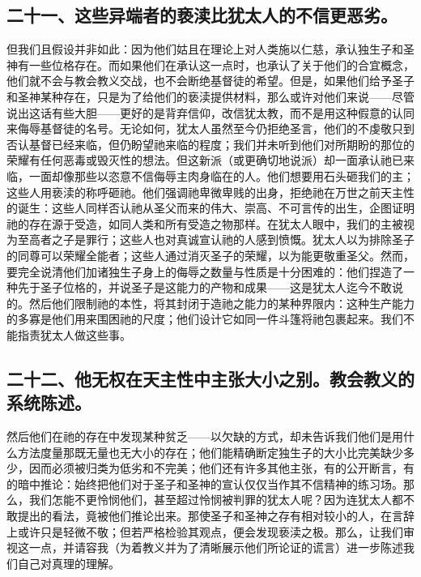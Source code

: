 
\subsection{二十一、这些异端者的亵渎比犹太人的不信更恶劣。}

但我们且假设并非如此：因为他们姑且在理论上对人类施以仁慈，承认独生子和圣神有一些位格存在。而如果他们在承认这一点时，也承认了关于他们的合宜概念，他们就不会与教会教义交战，也不会断绝基督徒的希望。但是，如果他们给予圣子和圣神某种存在，只是为了给他们的亵渎提供材料，那么或许对他们来说——尽管说出这话有些大胆——更好的是背弃信仰，改信犹太教，而不是用这种假意的认同来侮辱基督徒的名号。无论如何，犹太人虽然至今仍拒绝圣言，他们的不虔敬只到否认基督已经来临，但仍盼望祂来临的程度；我们并未听到他们对所期盼的那位的荣耀有任何恶毒或毁灭性的想法。但这新派（或更确切地说派）却一面承认祂已来临，一面却像那些以恣意不信侮辱主肉身临在的人。他们想要用石头砸我们的主；这些人用亵渎的称呼砸祂。他们强调祂卑微卑贱的出身，拒绝祂在万世之前天主性的诞生：这些人同样否认祂从圣父而来的伟大、崇高、不可言传的出生，企图证明祂的存在源于受造，如同人类和所有受造之物那样。在犹太人眼中，我们的主被视为至高者之子是罪行；这些人也对真诚宣认祂的人感到愤慨。犹太人以为排除圣子的同尊可以荣耀全能者；这些人通过消灭圣子的荣耀，以为能更敬重圣父。然而，要完全说清他们加诸独生子身上的侮辱之数量与性质是十分困难的：他们捏造了一种先于圣子位格的，并说圣子是这能力的产物和成果——这是犹太人迄今不敢说的。然后他们限制祂的本性，将其封闭于造祂之能力的某种界限内：这种生产能力的多寡是他们用来围困祂的尺度；他们设计它如同一件斗篷将祂包裹起来。我们不能指责犹太人做这些事。\par


\subsection{二十二、他无权在天主性中主张大小之别。教会教义的系统陈述。}

然后他们在祂的存在中发现某种贫乏——以欠缺的方式，却未告诉我们他们是用什么方法度量那既无量也无大小的存在；他们能精确断定独生子的大小比完美缺少多少，因而必须被归类为低劣和不完美；他们还有许多其他主张，有的公开断言，有的暗中推论：始终把他们对于圣子和圣神的宣认仅仅当作其不信精神的练习场。那么，我们怎能不更怜悯他们，甚至超过怜悯被判罪的犹太人呢？因为连犹太人都不敢提出的看法，竟被他们推论出来。那使圣子和圣神之存有相对较小的人，在言辞上或许只是轻微不敬；但若严格检验其观点，便会发现亵渎之极。那么，让我们审视这一点，并请容我（为着教义并为了清晰展示他们所论证的谎言）进一步陈述我们自己对真理的理解。\par

